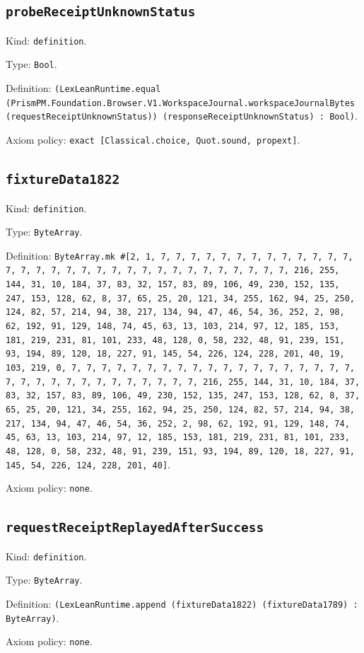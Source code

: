 \documentclass[11pt]{article}
\begin{document}
\subsection*{\texttt{probeReceiptUnknownStatus}}
\noindent Kind: \texttt{definition}.\par
\noindent Type: \texttt{Bool}.\par
\noindent Definition: \texttt{(LexLeanRuntime.equal (PrismPM.Foundation.Browser.V1.WorkspaceJournal.workspaceJournalBytes (requestReceiptUnknownStatus)) (responseReceiptUnknownStatus) : Bool)}.\par
\noindent Axiom policy: \texttt{exact [Classical.choice, Quot.sound, propext]}.\par
\subsection*{\texttt{fixtureData1822}}
\noindent Kind: \texttt{definition}.\par
\noindent Type: \texttt{ByteArray}.\par
\noindent Definition: \texttt{ByteArray.mk \#[2, 1, 7, 7, 7, 7, 7, 7, 7, 7, 7, 7, 7, 7, 7, 7, 7, 7, 7, 7, 7, 7, 7, 7, 7, 7, 7, 7, 7, 7, 7, 7, 7, 7, 216, 255, 144, 31, 10, 184, 37, 83, 32, 157, 83, 89, 106, 49, 230, 152, 135, 247, 153, 128, 62, 8, 37, 65, 25, 20, 121, 34, 255, 162, 94, 25, 250, 124, 82, 57, 214, 94, 38, 217, 134, 94, 47, 46, 54, 36, 252, 2, 98, 62, 192, 91, 129, 148, 74, 45, 63, 13, 103, 214, 97, 12, 185, 153, 181, 219, 231, 81, 101, 233, 48, 128, 0, 58, 232, 48, 91, 239, 151, 93, 194, 89, 120, 18, 227, 91, 145, 54, 226, 124, 228, 201, 40, 19, 103, 219, 0, 7, 7, 7, 7, 7, 7, 7, 7, 7, 7, 7, 7, 7, 7, 7, 7, 7, 7, 7, 7, 7, 7, 7, 7, 7, 7, 7, 7, 7, 7, 7, 7, 216, 255, 144, 31, 10, 184, 37, 83, 32, 157, 83, 89, 106, 49, 230, 152, 135, 247, 153, 128, 62, 8, 37, 65, 25, 20, 121, 34, 255, 162, 94, 25, 250, 124, 82, 57, 214, 94, 38, 217, 134, 94, 47, 46, 54, 36, 252, 2, 98, 62, 192, 91, 129, 148, 74, 45, 63, 13, 103, 214, 97, 12, 185, 153, 181, 219, 231, 81, 101, 233, 48, 128, 0, 58, 232, 48, 91, 239, 151, 93, 194, 89, 120, 18, 227, 91, 145, 54, 226, 124, 228, 201, 40]}.\par
\noindent Axiom policy: \texttt{none}.\par
\subsection*{\texttt{requestReceiptReplayedAfterSuccess}}
\noindent Kind: \texttt{definition}.\par
\noindent Type: \texttt{ByteArray}.\par
\noindent Definition: \texttt{(LexLeanRuntime.append (fixtureData1822) (fixtureData1789) : ByteArray)}.\par
\noindent Axiom policy: \texttt{none}.\par
\end{document}
